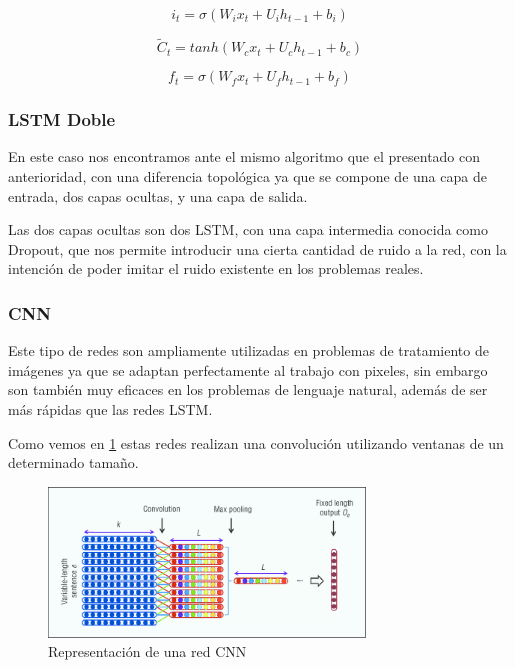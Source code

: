 \begin{equation}
i_t = \sigma(W_ix_t + U_ih_{t-1} + b_i)
\end{equation}

\begin{equation}
\widetilde{C}_t = tanh(W_cx_t + U_ch_{t-1} + b_c)
\end{equation}

\begin{equation}
f_t = \sigma(W_fx_t + U_fh_{t-1} + b_f)
\end{equation}




\subsubsection{LSTM Doble}

En este caso nos encontramos ante el mismo algoritmo que el presentado con anterioridad, con una diferencia topológica ya que se compone de una capa de entrada, dos capas ocultas, y una capa de salida.

Las dos capas ocultas son dos LSTM, con una capa intermedia conocida como Dropout, que nos permite introducir una cierta cantidad de ruido a la red, con la intención de poder imitar el ruido existente en los problemas reales.

\subsubsection{CNN}

Este tipo de redes son ampliamente utilizadas en problemas de tratamiento de imágenes ya que se adaptan perfectamente al trabajo con pixeles, sin embargo son también muy eficaces en los problemas de lenguaje natural, además de ser más rápidas que las redes LSTM.

Como vemos en \ref{cnn} estas redes realizan una convolución utilizando ventanas de un determinado tamaño.

\begin{figure}[!ht]
	\centering
	\includegraphics[width=0.75\textwidth]{imaxes/cnn1.png}
	\caption{Representación de una red CNN}
	\label{cnn}
\end{figure}

